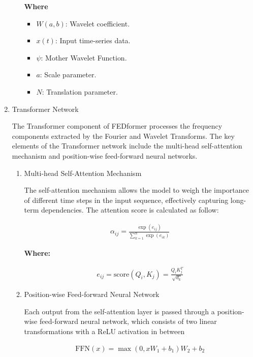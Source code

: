 \documentclass[conference]{IEEEtran}
\begin{document}
\begin{enumerate}
\begin{enumerate}
        \textbf{Where}
        \begin{itemize}
            \item $W(a, b)$: Wavelet coefficient.
            \item $x(t)$: Input time-series data.
            \item $\psi$: Mother Wavelet Function.
            \item $a$: Scale parameter.
            \item $N$: Translation parameter.
        \end{itemize}

    \end{enumerate}

    \item Transformer Network

    The Transformer component of FEDformer processes the frequency components extracted by the Fourier and Wavelet Transforms. The key elements of the Transformer network include the multi-head self-attention mechanism and position-wise feed-forward neural networks.

        \begin{enumerate}
            \item Multi-head Self-Attention Mechanism

            The self-attention mechanism allows the model to weigh the importance of different time steps in the input sequence, effectively capturing long-term dependencies. The attention score is calculated as follow:

            \begin{align*}
                \alpha_{ij} = \frac{\exp(e_{ij})}{\sum_{k=1}^{n} \exp(e_{ik})}
            \end{align*}

            \textbf{Where:}

            \begin{align*}
                e_{ij} = \text{score}(Q_i, K_j) = \frac{Q_i K_j^T}{\sqrt{d_k}}
            \end{align*}

            \item Position-wise Feed-forward Neural Network

            Each output from the self-attention layer is passed through a position-wise feed-forward neural network, which consists of two linear transformations with a ReLU activation in between

            \begin{align*}
                \text{FFN}(x) = \max(0, xW_1 + b_1)W_2 + b_2
            \end{align*}


\end{enumerate}
\end{enumerate}
\end{document}
